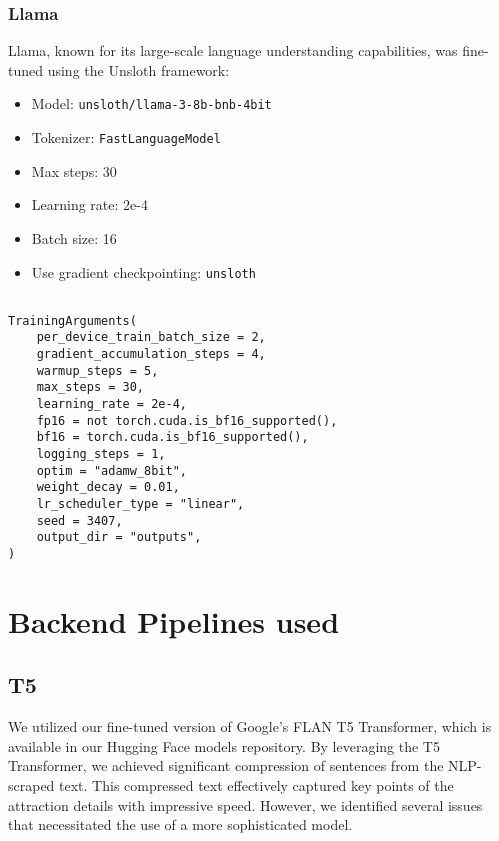 \documentclass[conference]{IEEEtran}
\begin{document}
        \subsubsection{Llama}

            Llama, known for its large-scale language understanding capabilities, was fine-tuned using the Unsloth framework:
            \begin{itemize}
                \item Model: \texttt{unsloth/llama-3-8b-bnb-4bit}
                \item Tokenizer: \texttt{FastLanguageModel}
                \item Max steps: 30
                \item Learning rate: 2e-4
                \item Batch size: 16
                \item Use gradient checkpointing: \texttt{unsloth}
            \end{itemize}

\begin{mdframed}[linewidth=1pt, innerleftmargin=15pt, innerrightmargin=15pt, innertopmargin=15pt, innerbottommargin=15pt]
\small
\begin{verbatim}

TrainingArguments(
    per_device_train_batch_size = 2,
    gradient_accumulation_steps = 4,
    warmup_steps = 5,
    max_steps = 30,
    learning_rate = 2e-4,
    fp16 = not torch.cuda.is_bf16_supported(),
    bf16 = torch.cuda.is_bf16_supported(),
    logging_steps = 1,
    optim = "adamw_8bit",
    weight_decay = 0.01,
    lr_scheduler_type = "linear",
    seed = 3407,
    output_dir = "outputs",
)
\end{verbatim}
\end{mdframed}


\section{Backend Pipelines used}

    \subsection{T5}

        We utilized our fine-tuned version of Google's FLAN T5 Transformer, which is available in our Hugging Face models repository. By leveraging the T5 Transformer, we achieved significant compression of sentences from the NLP-scraped text. This compressed text effectively captured key points of the attraction details with impressive speed. However, we identified several issues that necessitated the use of a more sophisticated model.
\end{document}
